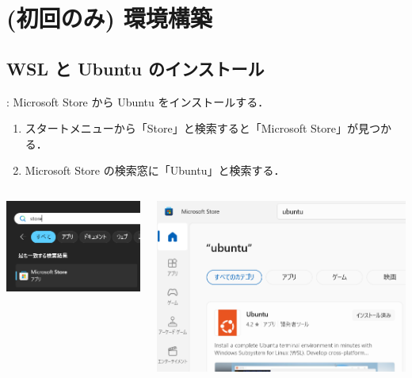 \documentclass[aspectratio=169,dvipdfmx,cjk]{beamer}
\begin{document}
\section{(初回のみ) 環境構築}

\subsection{WSL と Ubuntu のインストール}
\begin{frame}{\insertsection \thesubsection: \insertsubsection}
  Microsoft Store から Ubuntu をインストールする．
  \begin{enumerate}
    \item スタートメニューから「Store」と検索すると「Microsoft Store」が見つかる．
    \item Microsoft Store の検索窓に「Ubuntu」と検索する．
  \end{enumerate}
  \begin{columns}
    \begin{column}{0.4\textwidth}
        \includegraphics[width=1.0\linewidth]{fig/store.png}
    \end{column}
    \begin{column}{0.4\textwidth}
      \includegraphics[width=1.0\linewidth]{fig/store-ubuntu.png}
    \end{column}
  \end{columns}
\end{frame}
\end{document}
